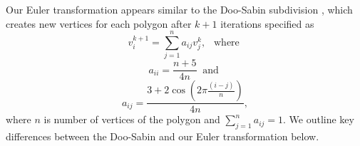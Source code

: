 Our Euler transformation appears similar to the Doo-Sabin subdivision \cite{DoSa1978},
which creates new vertices for each polygon after $k+1$ iterations specified as
\[v_i^{k+1} = \sum_{j =1}^{n} a_{ij} v_j^{k}, ~~\mbox{ where }\]
\[a_{ii} = \frac{n + 5}{4n} ~\mbox{ and }\] 
\[a_{ij} = \frac{3 + 2 \cos(2\pi\frac{(i -j)}{n})} {4n}, \] 
where $n$ is number of vertices of the polygon and $\sum_{j=1}^{n}a_{ij} = 1$.
We outline key differences between the Doo-Sabin and our Euler transformation below.    
